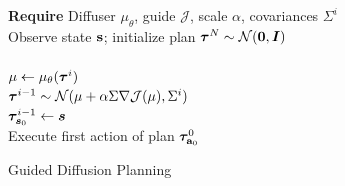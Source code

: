 \def\NoNumber#1{{\def\alglinenumber##1{}\STATE #1}\addtocounter{ALG@line}{-1}}

{\centering
\begin{figure}[t]
\begin{minipage}{\linewidth}
  \begin{algorithm}[H]
    \caption{Guided Diffusion Planning}
    \label{alg:rl}
    \begin{algorithmic}[1]
    \STATE \textbf{Require} Diffuser $\mu_\theta$, guide $\mathcal{J}$, scale $\alpha$, covariances $\Sigma^i$ \\
        \STATE Observe state $\mathbf{s}$; initialize plan  $\bm{\tau}^{N} \sim \mathcal{N}(\bm{0}, \bm{I})$ \\
            \STATE \small{\color{gray}} \\
            \STATE $\mu \gets \mu_\theta(\bm{\tau}^{i})$ \\
            \STATE \small{\color{gray}} 
            \STATE $\bm{\tau}^{i-1} \sim \mathcal{N}(\mu + \alpha \Sigma \nabla \mathcal{J}(\mu), \Sigma^i)$\\
            \STATE \small{\color{gray}}
            \STATE $\bm{\tau}^{i-1}_{{\bm{s}}_0} \gets {\bm{s}}$ \hspace{0.15cm} \\
        \ENDFOR
        \STATE Execute first action of plan $\bm{\tau}^{0}_{\mathbf{a}_0}$
    \ENDWHILE
    \end{algorithmic}
  \end{algorithm}
\end{minipage}
\vspace{-.2cm}
\end{figure}
}
